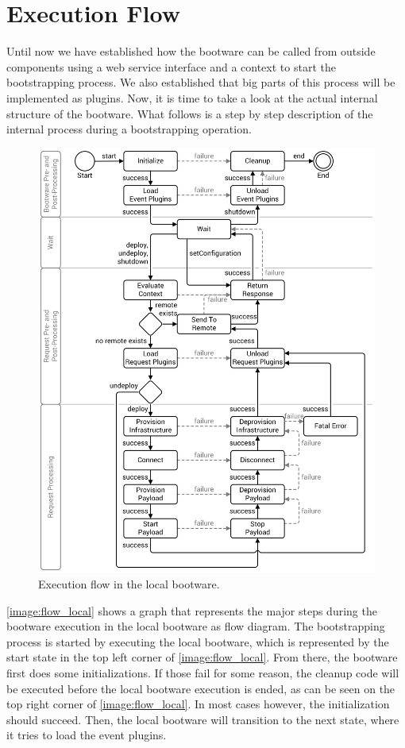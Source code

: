 \section{Execution Flow}
\label{design:flow}

Until now we have established how the bootware can be called from outside components using a web service interface and a context to start the bootstrapping process.
We also established that big parts of this process will be implemented as plugins.
Now, it is time to take a look at the actual internal structure of the bootware.
What follows is a step by step description of the internal process during a bootstrapping operation.

\begin{figure}[!htbp]
	\centering
	\includegraphics[resolution=600]{design/assets/flow_local}
	\caption{Execution flow in the local bootware.}
	\label{image:flow_local}
\end{figure}

\autoref{image:flow_local} shows a graph that represents the major steps during the bootware execution in the local bootware as flow diagram.
The bootstrapping process is started by executing the local bootware, which is represented by the start state in the top left corner of \autoref{image:flow_local}.
From there, the bootware first does some initializations.
If those fail for some reason, the cleanup code will be executed before the local bootware execution is ended, as can be seen on the top right corner of \autoref{image:flow_local}.
In most cases however, the initialization should succeed.
Then, the local bootware will transition to the next state, where it tries to load the event plugins.

